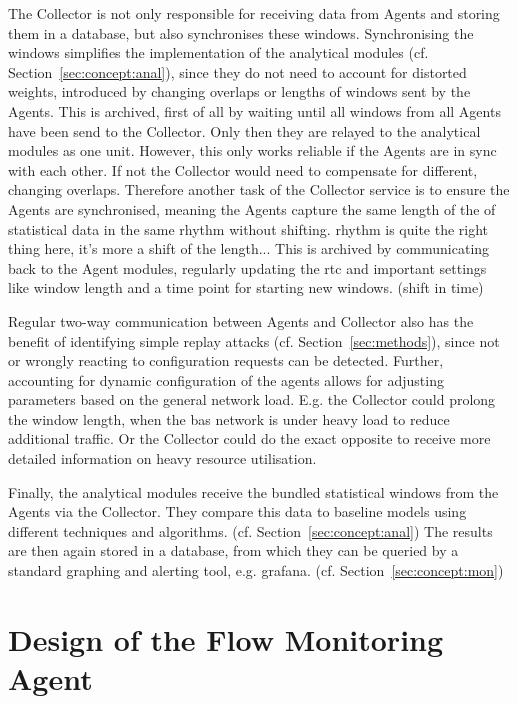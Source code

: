 The Collector is not only responsible for receiving data from Agents and storing them in a database, but also synchronises these windows. Synchronising the windows simplifies the implementation of the analytical modules (cf. Section~\ref{sec:concept:anal}), since they do not need to account for distorted weights, introduced by changing overlaps or lengths of windows sent by the Agents.
This is archived, first of all by waiting until all windows from all Agents have been send to the Collector. Only then they are relayed to the analytical modules as one unit.
However, this only works reliable if the Agents are in sync with each other. If not the Collector would need to compensate for different, changing overlaps. Therefore another task of the Collector service is to ensure the Agents are synchronised, meaning the Agents capture the same length of the of statistical data in the same rhythm without shifting. \alert{rhythm is quite the right thing here, it's more a shift of the length...}
This is archived by communicating back to the Agent modules, regularly updating the \gls{rtc} and important settings like window length and a time point for starting new windows. (shift in time)

Regular two-way communication between Agents and Collector also has the benefit of identifying simple replay attacks (cf. Section~\ref{sec:methods}), since not or wrongly reacting to configuration requests can be detected.
Further, accounting for dynamic configuration of the agents allows for adjusting parameters based on the general network load.
E.g. the Collector could prolong the window length, when the \gls{bas} network is under heavy load to reduce additional traffic. Or the Collector could do the exact opposite to receive more detailed information on heavy resource utilisation.

Finally, the analytical modules receive the bundled statistical windows from the Agents via the Collector. They compare this data to baseline models using different techniques and algorithms. (cf. Section~\ref{sec:concept:anal})
The results are then again stored in a database, from which they can be queried by a standard graphing and alerting tool, e.g. \gls{grafana}. (cf. Section~\ref{sec:concept:mon})


\section{Design of the Flow Monitoring Agent}
\label{sec:concept:agent}

